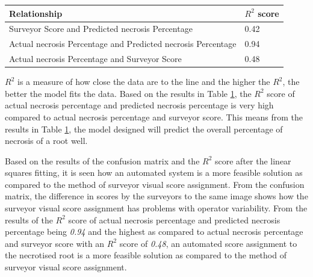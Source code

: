 \documentclass[conference]{IEEEtran}
\begin{document}
{\begin{table}[t!]
    \begin{tabular}{|l|l|}
    \hline
      Relationship & $R^{2}$ score  \\    \hline
      Surveyor Score and Predicted necrosis Percentage & 0.42  \\\hline
      Actual necrosis Percentage and Predicted necrosis Percentage & 0.94  \\\hline
      Actual necrosis Percentage and Surveyor Score & 0.48  \\ \hline
    \end{tabular}


    \label{tbl:fitting}
\end{table}}

$R^{2}$ is a measure of how close the data are to the line and the higher the $R^{2}$, the better the model fits the data. Based on the results in Table \ref{tbl:fitting}, the $R^{2}$ score of actual necrosis percentage and predicted necrosis percentage is very high compared to actual necrosis percentage and surveyor score. This means from the results in Table \ref{tbl:fitting}, the model designed will predict the overall percentage of necrosis of a root well.

Based on the results of the confusion matrix and the $R^{2}$ score after the linear squares fitting, it is seen how an automated system is a more feasible solution as compared to the method of surveyor visual score assignment. From the confusion matrix, the difference in scores by the surveyors to the same image shows how the surveyor visual score assignment has problems with operator variability. From the results of the $R^{2}$ score of actual necrosis percentage and predicted necrosis percentage being \emph{0.94} and the highest as compared to actual necrosis percentage and surveyor score with an $R^{2}$ score of \emph{0.48},  an automated score assignment to the necrotised root is a more feasible solution as compared to the method of surveyor visual score assignment.



%
%
\end{document}
